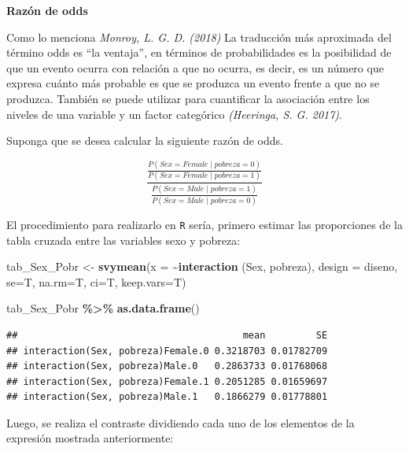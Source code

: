 \documentclass[
  spanish,
  12pt,
]{book}
\newenvironment{Shaded}{\begin{snugshade}}{\end{snugshade}}
\newcommand{\AttributeTok}[1]{\textcolor[rgb]{0.13,0.29,0.53}{#1}}
\newcommand{\FunctionTok}[1]{\textcolor[rgb]{0.13,0.29,0.53}{\textbf{#1}}}
\newcommand{\NormalTok}[1]{#1}
\newcommand{\OtherTok}[1]{\textcolor[rgb]{0.56,0.35,0.01}{#1}}
\newcommand{\SpecialCharTok}[1]{\textcolor[rgb]{0.81,0.36,0.00}{\textbf{#1}}}
\begin{document}
\textbf{Razón de odds}

Como lo menciona \emph{Monroy, L. G. D. (2018)} La traducción más aproximada del término odds es ``la ventaja'', en términos de probabilidades es la posibilidad de que un evento ocurra con relación a que no ocurra, es decir, es un número que expresa cuánto más probable es que se produzca un evento frente a que no se produzca. También se puede utilizar para cuantificar la asociación entre los niveles de una variable y un factor categórico \emph{(Heeringa, S. G. 2017)}.

Suponga que se desea calcular la siguiente razón de odds.

\[
 \frac{\frac{P(Sex = Female \mid pobreza = 0 )}{P(Sex = Female \mid pobreza = 1 )}}{
 \frac{P(Sex = Male \mid pobreza = 1 )}{P(Sex = Male \mid pobreza = 0 )}
 }
\]

El procedimiento para realizarlo en \texttt{R} sería, primero estimar las proporciones de la tabla cruzada entre las variables sexo y pobreza:

\begin{Shaded}
\begin{Highlighting}[]
\NormalTok{tab\_Sex\_Pobr }\OtherTok{\textless{}{-}} \FunctionTok{svymean}\NormalTok{(}\AttributeTok{x =} \SpecialCharTok{\textasciitilde{}}\FunctionTok{interaction}\NormalTok{ (Sex, pobreza), }\AttributeTok{design =}\NormalTok{ diseno, }
                        \AttributeTok{se=}\NormalTok{T, }\AttributeTok{na.rm=}\NormalTok{T, }\AttributeTok{ci=}\NormalTok{T, }\AttributeTok{keep.vars=}\NormalTok{T)}

\NormalTok{tab\_Sex\_Pobr }\SpecialCharTok{\%\textgreater{}\%}  \FunctionTok{as.data.frame}\NormalTok{()}
\end{Highlighting}
\end{Shaded}

\begin{verbatim}
##                                        mean         SE
## interaction(Sex, pobreza)Female.0 0.3218703 0.01782709
## interaction(Sex, pobreza)Male.0   0.2863733 0.01768068
## interaction(Sex, pobreza)Female.1 0.2051285 0.01659697
## interaction(Sex, pobreza)Male.1   0.1866279 0.01778801
\end{verbatim}

Luego, se realiza el contraste dividiendo cada uno de los elementos de la expresión mostrada anteriormente:
\end{document}
